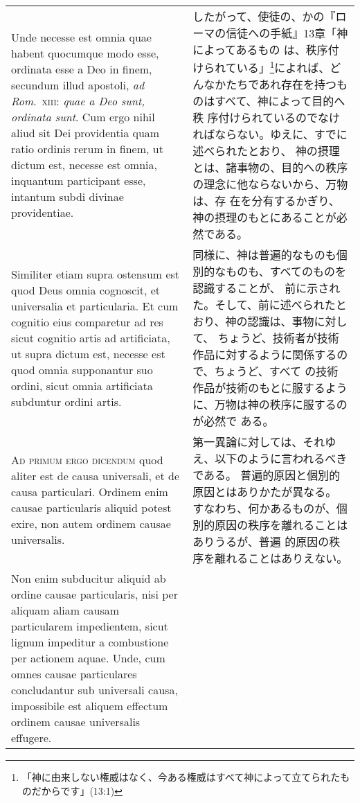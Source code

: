 \documentclass[10pt]{jsarticle} %
\begin{document}
\begin{longtable}{p{21em}p{21em}}
\\

 Unde
necesse est omnia quae habent quocumque modo esse, ordinata esse a Deo
in finem, secundum illud apostoli, {\itshape ad Rom}.~{\scshape xiii}: {\itshape quae a Deo sunt,
ordinata sunt}. Cum ergo nihil aliud sit Dei providentia quam ratio
ordinis rerum in finem, ut dictum est, necesse est omnia, inquantum
participant esse, intantum subdi divinae providentiae. 

&

したがって、使徒の、かの『ローマの信徒への手紙』13章「神によってあるもの
 は、秩序付けられている」\footnote{「神に由来しない権威はなく、今ある権威はすべて神によって立てられたものだからです」(13:1)}によれば、どんなかたちであれ存在を持つものはすべて、神によって目的へ秩
 序付けられているのでなければならない。ゆえに、すでに述べられたとおり、
 神の摂理とは、諸事物の、目的への秩序の理念に他ならないから、万物は、存
 在を分有するかぎり、神の摂理のもとにあることが必然である。


\\


Similiter etiam
supra ostensum est quod Deus omnia cognoscit, et universalia et
particularia. Et cum cognitio eius comparetur ad res sicut cognitio
artis ad artificiata, ut supra dictum est, necesse est quod omnia
supponantur suo ordini, sicut omnia artificiata subduntur ordini artis.

&

同様に、神は普遍的なものも個別的なものも、すべてのものを認識することが、
 前に示された。そして、前に述べられたとおり、神の認識は、事物に対して、
 ちょうど、技術者が技術作品に対するように関係するので、ちょうど、すべて
 の技術作品が技術のもとに服するように、万物は神の秩序に服するのが必然で
 ある。

\\


{\scshape Ad primum ergo dicendum} quod aliter est de
causa universali, et de causa particulari. Ordinem enim causae
particularis aliquid potest exire, non autem ordinem causae
universalis. 

&

第一異論に対しては、それゆえ、以下のように言われるべきである。
普遍的原因と個別的原因とはありかたが異なる。
すなわち、何かあるものが、個別的原因の秩序を離れることはありうるが、普遍
 的原因の秩序を離れることはありえない。

\\


Non enim subducitur aliquid ab ordine causae particularis,
nisi per aliquam aliam causam particularem impedientem, sicut lignum
impeditur a combustione per actionem aquae. Unde, cum omnes causae
particulares concludantur sub universali causa, impossibile est aliquem
effectum ordinem causae universalis effugere. 



\end{longtable}
\end{document}
